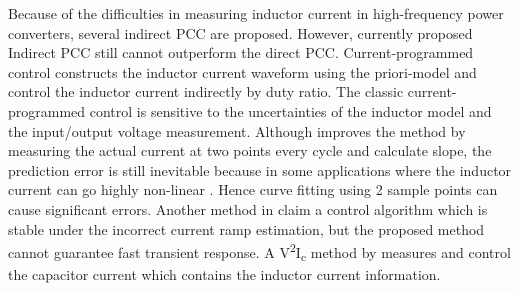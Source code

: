 Because of the difficulties in measuring inductor current in high-frequency power converters, several indirect PCC are proposed. However, currently proposed Indirect PCC  still cannot outperform the direct PCC.
Current-programmed control constructs the inductor current waveform using the priori-model and control the inductor current indirectly by duty ratio.
The classic current-programmed control \cite{Chendragan2003} is sensitive to the uncertainties of the inductor model and the input/output voltage measurement. Although \cite{Taeed2014} improves the method by measuring the actual current at two points every cycle and calculate slope, the prediction error is still inevitable because in some applications where the inductor current can go highly non-linear \cite{Ahsanuzzamanprodic2012apec} \cite{DiCapua2016}. Hence curve fitting using 2 sample points can cause significant errors. Another method in \cite{Chattopadhyay2006} claim a control algorithm which is stable under the incorrect current ramp estimation, but the proposed method cannot guarantee fast transient response.
A V\textsuperscript{2}I\textsubscript{c} method by \cite{Huerta2013} measures and control the capacitor current which contains the inductor current information.